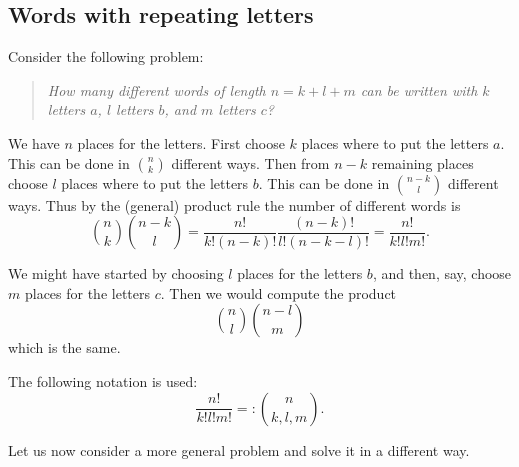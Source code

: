 \subsection{Words with repeating letters}
Consider the following problem:
\begin{quote}
\emph{How many different words of length $n=k+l+m$ can be written with $k$ letters $a$, $l$ letters $b$, and $m$ letters $c$?}
\end{quote}

We have $n$ places for the letters.
First choose $k$ places where to put the letters $a$.
This can be done in $\binom{n}{k}$ different ways.
Then from $n-k$ remaining places choose $l$ places where to put the letters $b$.
This can be done in $\binom{n-k}{l}$ different ways.
Thus by the (general) product rule the number of different words is
\[
\binom{n}{k} \binom{n-k}{l} = \frac{n!}{k!(n-k)!} \frac{(n-k)!}{l!(n-k-l)!} = \frac{n!}{k!l!m!}.
\]

We might have started by choosing $l$ places for the letters $b$, and then, say, choose $m$ places for the letters $c$.
Then we would compute the product
\[
\binom{n}{l} \binom{n-l}{m}
\]
which is the same.

The following notation is used:
\[
\frac{n!}{k!l!m!} =: \binom{n}{k, l, m}.
\]

Let us now consider a more general problem and solve it in a different way.
